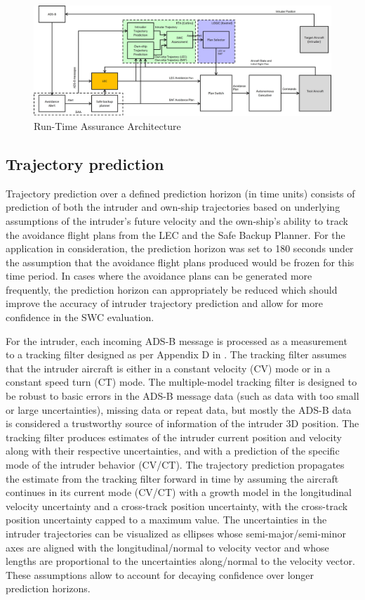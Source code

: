 \begin{figure}
	\centering
	\includegraphics[width=\textwidth]{figures/rta-arch.jpg}
	\caption{Run-Time Assurance Architecture}
	\label{fig:rta-arch}
\end{figure}

\subsection{Trajectory prediction} 
Trajectory prediction over a defined prediction horizon (in time units) consists of prediction of both the intruder and own-ship trajectories based on underlying assumptions of the intruder's future velocity and the own-ship's ability to track the avoidance flight plans from the LEC and the Safe Backup Planner. For the application in consideration, the prediction horizon was set to 180 seconds under the assumption that the avoidance flight plans produced would be frozen for this time period. In cases where the avoidance plans can be generated more frequently, the prediction horizon can appropriately be reduced which should improve the accuracy of intruder trajectory prediction and allow for more confidence in the SWC evaluation.

For the intruder, each incoming ADS-B message is processed as a measurement to a tracking filter designed as per Appendix D in \cite{DO_366A}. The tracking filter assumes that the intruder aircraft is either in a constant velocity (CV) mode or in a constant speed turn (CT) mode. The multiple-model tracking filter is designed to be robust to basic errors in the ADS-B message data (such as data with too small or large uncertainties), missing data or repeat data, but mostly the ADS-B data is considered a trustworthy source of information of the intruder 3D position. The tracking filter produces estimates of the intruder current position and velocity along with their respective uncertainties, and with a prediction of the specific mode of the intruder behavior (CV/CT). The trajectory prediction propagates the estimate from the tracking filter forward in time by assuming the aircraft continues in its current mode (CV/CT) with a growth model in the longitudinal velocity uncertainty and a cross-track position uncertainty, with the cross-track position uncertainty capped to a maximum value. The uncertainties in the intruder trajectories can be visualized as ellipses whose semi-major/semi-minor axes are aligned with the longitudinal/normal to velocity vector and whose lengths are proportional to the uncertainties along/normal to the velocity vector. These assumptions allow to account for decaying confidence over longer prediction horizons.

